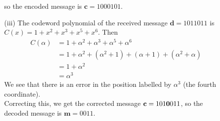 \documentclass[11pt]{article}
\renewcommand{\vec}[1]{\mathbf{#1}}
\begin{document}
\begin{itemize}
\begin{itemize}
                   so the encoded message is $\vec{c} = \text{1000101}$.
      \item[(iii)] The codeword polynomial of the received message $\vec{d} = \text{1011011}$ is
                   $C(x) = 1 + x^2 + x^3 + x^5 + x^6$.
                   Then
                   \begin{align*}
                     C(\alpha) &= 1 + \alpha^2 + \alpha^3 + \alpha^5 + \alpha^6\\
                               &= 1 + \alpha^2 + (\alpha^2+1) + (\alpha + 1) + (\alpha^2 + \alpha)\\
                               &= 1 + \alpha^2\\
                               &= \alpha^3
                   \end{align*}
                   We see that there is an error in the position labelled by $\alpha^3$ (the fourth coordinate).\\
                   Correcting this, we get the corrected message $\vec{c} = \text{101\textbf{0}011}$,
                   so the decoded message is $\vec{m} = \text{0011}$.
      \end{itemize}
\end{itemize}
\end{document}
